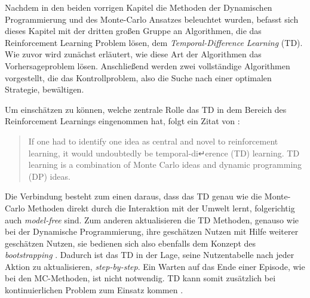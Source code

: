
Nachdem in den beiden vorrigen Kapitel die Methoden der Dynamischen Programmierung und des Monte-Carlo Ansatzes beleuchtet wurden, befasst sich dieses Kapitel mit der dritten großen Gruppe an Algorithmen, die das Reinforcement Learning Problem lösen, dem \textit{Temporal-Difference Learning} (TD).
Wie zuvor wird zunächst erläutert, wie diese Art der Algorithmen das Vorhersageproblem lösen. Anschließend werden zwei vollständige Algorithmen vorgestellt, die das Kontrollproblem, also die Suche nach einer optimalen Strategie, bewältigen.
\par 
Um einschätzen zu können, welche zentrale Rolle das TD in dem Bereich des Reinforcement Learnings eingenommen hat, folgt ein Zitat von \cite{Sutton1998}:
\begin{quote}
    If one had to identify one idea as central and novel to reinforcement learning, it would undoubtedly be temporal-di↵erence (TD) learning. TD learning is a combination of Monte Carlo ideas and dynamic programming (DP) ideas. \cite[S.~119]{Sutton1998}
\end{quote}

Die Verbindung besteht zum einen daraus, dass das TD genau wie die Monte-Carlo Methoden direkt durch die Interaktion mit der Umwelt lernt, folgerichtig auch \textit{model-free} sind. Zum anderen aktualisieren die TD Methoden, genauso wie bei der Dynamische Programmierung, ihre geschätzen Nutzen mit Hilfe weiterer geschätzen Nutzen, sie bedienen sich also ebenfalls dem Konzept des \textit{bootstrapping} \cite[S.~119]{Sutton1998}. Dadurch ist das TD in der Lage, seine Nutzentabelle nach jeder Aktion zu aktualisieren, \textit{step-by-step}. Ein Warten auf das Ende einer Episode, wie bei den MC-Methoden, ist nicht notwendig. TD kann somit zusätzlich bei kontinuierlichen Problem zum Einsatz kommen \cite[S.~124]{Sutton1998}.
\par 

